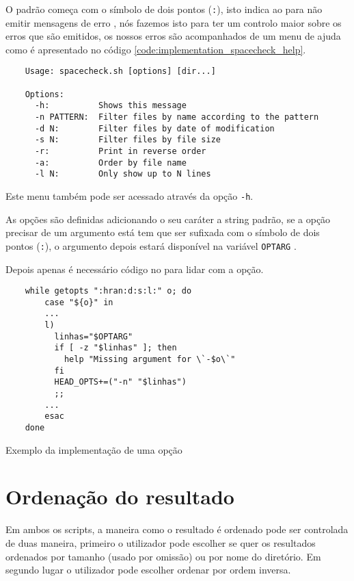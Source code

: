 O padrão começa com o símbolo de dois pontos (\Verb|:|), isto indica ao
 para não emitir mensagens de erro \cite[2837]{posix}, nós
fazemos isto para ter um controlo maior sobre os erros que são emitidos, os
nossos erros são acompanhados de um menu de ajuda como é apresentado no código
\ref{code:implementation_spacecheck_help}.

\begin{listing}[H]
	\centering
	\begin{verbatim}
    Usage: spacecheck.sh [options] [dir...]

    Options:
      -h:          Shows this message
      -n PATTERN:  Filter files by name according to the pattern
      -d N:        Filter files by date of modification
      -s N:        Filter files by file size
      -r:          Print in reverse order
      -a:          Order by file name
      -l N:        Only show up to N lines
  \end{verbatim}
	\cprotect\caption{Menu de ajuda do \Verb|spacecheck.sh|}
	\label{code:implementation_spacecheck_help}
\end{listing}

Este menu também pode ser acessado através da opção \Verb|-h|.

As opções são definidas adicionando o seu caráter a string padrão, se a opção
precisar de um argumento está tem que ser sufixada com o símbolo de dois pontos
(\Verb|:|), o argumento depois estará disponível na variável \Verb|OPTARG|
\cite[2838]{posix}.

Depois apenas é necessário código no  para lidar com a opção.

\begin{listing}[H]
	\centering
	\begin{verbatim}
    while getopts ":hran:d:s:l:" o; do
        case "${o}" in
        ...
        l)
          linhas="$OPTARG"
          if [ -z "$linhas" ]; then
            help "Missing argument for \`-$o\`"
          fi
          HEAD_OPTS+=("-n" "$linhas")
          ;;
        ...
        esac
    done
  \end{verbatim}
	\caption{Exemplo da implementação de uma opção}
\end{listing}

\section{Ordenação do resultado}

Em ambos os scripts, a maneira como o resultado é ordenado pode ser controlada
de duas maneira, primeiro o utilizador pode escolher se quer os resultados
ordenados por tamanho (usado por omissão) ou por nome do diretório. Em segundo
lugar o utilizador pode escolher ordenar por ordem inversa.

